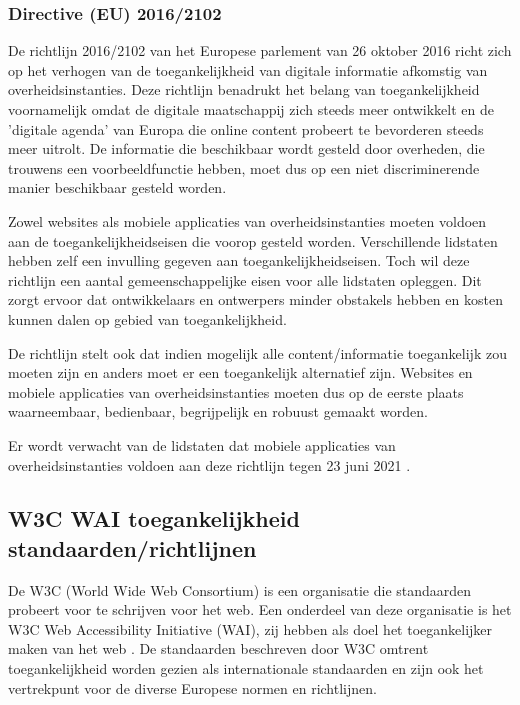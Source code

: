 \subsubsection{Directive (EU) 2016/2102}
\label{directive}
De richtlijn 2016/2102 van het Europese parlement van 26 oktober 2016 richt zich op het
verhogen van de toegankelijkheid van digitale informatie afkomstig van overheidsinstanties.
Deze richtlijn benadrukt het belang van toegankelijkheid voornamelijk omdat de digitale maatschappij zich steeds meer ontwikkelt en de ’digitale agenda’ van Europa die online content probeert te bevorderen steeds meer uitrolt. De informatie die beschikbaar wordt gesteld door overheden, die trouwens een voorbeeldfunctie hebben, moet dus op een niet discriminerende manier beschikbaar gesteld worden.


 Zowel websites als mobiele applicaties van overheidsinstanties moeten voldoen aan de toegankelijkheidseisen die voorop gesteld worden. Verschillende lidstaten hebben zelf een invulling gegeven aan toegankelijkheidseisen. Toch wil deze richtlijn een aantal gemeenschappelijke eisen voor alle lidstaten opleggen. Dit zorgt ervoor dat ontwikkelaars en ontwerpers minder obstakels hebben en kosten kunnen dalen op gebied van toegankelijkheid.

De richtlijn stelt ook dat indien mogelijk alle content/informatie toegankelijk zou moeten zijn en anders moet er een toegankelijk alternatief zijn. Websites en mobiele applicaties van overheidsinstanties moeten dus op de eerste plaats waarneembaar, bedienbaar, begrijpelijk en robuust gemaakt worden.
 
Er wordt verwacht van de lidstaten dat mobiele applicaties van overheidsinstanties voldoen aan deze richtlijn tegen 23 juni 2021 \autocite{directive2016}.

\subsection{W3C WAI toegankelijkheid standaarden/richtlijnen}
\label{sec:standaarden}
De W3C (World Wide Web Consortium) is een organisatie die standaarden probeert voor te schrijven voor het web. Een onderdeel van deze organisatie is het W3C Web Accessibility Initiative (WAI), zij hebben als doel het toegankelijker maken van het web
 \autocite{introAccesibilityw3c}. De standaarden beschreven door W3C omtrent toegankelijkheid worden gezien als internationale standaarden en zijn ook het vertrekpunt voor de diverse Europese normen en richtlijnen.
 
